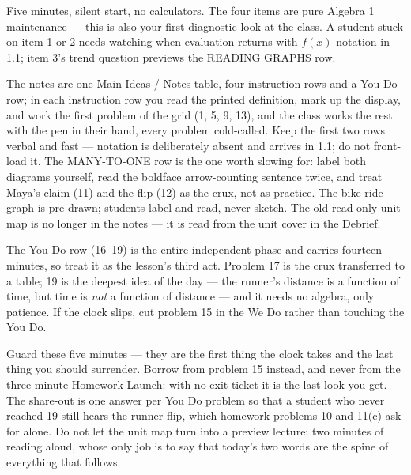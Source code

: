 \documentclass[10pt]{article}
\begin{document}
\begin{teachernote}[Warm-Up]
Five minutes, silent start, no calculators. The four items are pure Algebra 1
maintenance --- this is also your first diagnostic look at the class. A student
stuck on item 1 or 2 needs watching when evaluation returns with $f(x)$ notation
in 1.1; item 3's trend question previews the READING GRAPHS row.
\end{teachernote}

\begin{teachernote}
The notes are one Main Ideas / Notes table, four instruction rows and a You Do row;
in each instruction row you read the printed definition, mark up the display, and
work the first problem of the grid (1, 5, 9, 13), and the class works the rest with
the pen in their hand, every problem cold-called. Keep the first two rows verbal and
fast --- notation is deliberately absent and arrives in 1.1; do not front-load it.
The MANY-TO-ONE row is the one worth slowing for: label both diagrams yourself,
read the boldface arrow-counting sentence twice, and treat Maya's claim (11) and
the flip (12) as the crux, not as practice. The bike-ride graph is pre-drawn;
students label and read, never sketch. The old read-only unit map is no longer in
the notes --- it is read from the unit cover in the Debrief.

The You Do row (16--19) is the entire independent phase and carries fourteen
minutes, so treat it as the lesson's third act. Problem 17 is the crux transferred
to a table; 19 is the deepest idea of the day --- the runner's distance is a
function of time, but time is \textit{not} a function of distance --- and it needs
no algebra, only patience. If the clock slips, cut problem 15 in the We Do rather
than touching the You Do.
\end{teachernote}

\begin{teachernote}[Debrief]
Guard these five minutes --- they are the first thing the clock takes and the last
thing you should surrender. Borrow from problem 15 instead, and never from the
three-minute Homework Launch: with no exit ticket it is the last look you get. The
share-out is one answer per You Do problem so that a student who never reached 19
still hears the runner flip, which homework problems 10 and 11(c) ask for alone. Do
not let the unit map turn into a preview lecture: two minutes of reading aloud,
whose only job is to say that today's two words are the spine of everything that
follows.
\end{teachernote}
\end{document}
